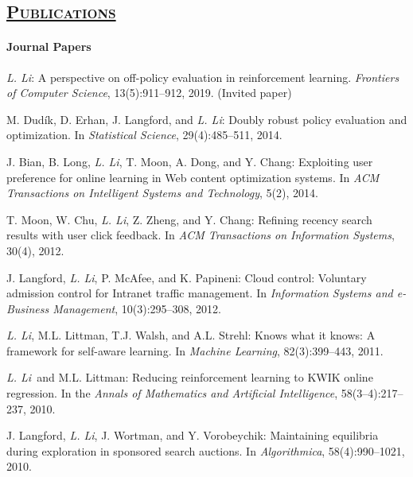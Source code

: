\documentclass[10pt,twoside,letterpaper]{article}
\newcommand{\selffont}[1]{{\textit{#1}}}
\newcommand{\venuefont}[1]{{\textit{#1}}}
\newcommand{\negitemspace}{\vspace{1mm}}
\newcommand{\myself}{\selffont{L. Li}}
\begin{document}
\subsection*{\textsc{\underline{Publications}}
}

\paragraph{Journal Papers} \negitemspace

\begin{compactenum}[(J1)]

\item{\myself: A perspective on off-policy evaluation in reinforcement learning.  \venuefont{Frontiers of Computer Science}, 13(5):911--912, 2019.  (Invited paper)}

\item{M. Dud\'ik, D. Erhan, J. Langford, and \myself: Doubly robust policy evaluation and optimization.  In \venuefont{Statistical Science}, 29(4):485--511, 2014.}

\item{J. Bian, B. Long, \myself, T. Moon, A. Dong, and Y. Chang: Exploiting user preference for online learning in Web content optimization systems.  In \venuefont{ACM Transactions on Intelligent Systems and Technology}, 5(2), 2014.}

\item{T. Moon, W. Chu, \myself, Z. Zheng, and Y. Chang: Refining recency search results with user click feedback.  In \venuefont{ACM Transactions on Information Systems}, 30(4), 2012.}

\item{J. Langford, \myself, P. McAfee, and K. Papineni: Cloud control: Voluntary admission control for Intranet traffic management.  In \venuefont{Information Systems and e-Business Management}, 10(3):295--308, 2012.}

\item{\myself, M.L. Littman, T.J. Walsh, and A.L. Strehl:
Knows what it knows: A framework for self-aware learning.  In \venuefont{Machine Learning}, 82(3):399--443, 2011.}

\item{\myself\ and M.L. Littman: Reducing reinforcement learning
to KWIK online regression.  In the \venuefont{Annals of Mathematics and
Artificial Intelligence}, 58(3--4):217--237, 2010.}

\item{J. Langford, \myself, J. Wortman, and Y.
Vorobeychik: Maintaining equilibria during exploration in
sponsored search auctions.  In \venuefont{Algorithmica},
58(4):990--1021, 2010.}


\end{compactenum}
\end{document}
